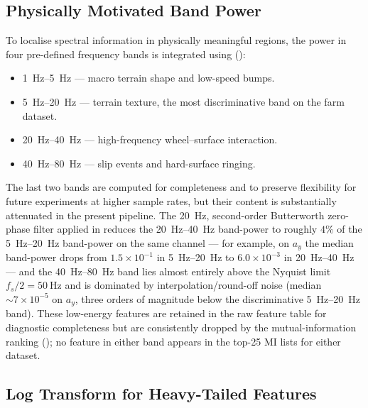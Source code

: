 \subsection{Physically Motivated Band Power}

To localise spectral information in physically meaningful regions, the power in four pre-defined frequency bands is integrated using  ():

\begin{itemize}
    \item \SIrange{1}{5}{\hertz} --- macro terrain shape and low-speed bumps.
    \item \SIrange{5}{20}{\hertz} --- terrain texture, the most discriminative band on the farm dataset.
    \item \SIrange{20}{40}{\hertz} --- high-frequency wheel--surface interaction.
    \item \SIrange{40}{80}{\hertz} --- slip events and hard-surface ringing.
\end{itemize}

The last two bands are computed for completeness and to preserve flexibility for future experiments at higher sample rates, but their content is substantially attenuated in the present pipeline. The \SI{20}{\hertz}, second-order Butterworth zero-phase filter applied in  reduces the \SIrange{20}{40}{\hertz} band-power to roughly $4\%$ of the \SIrange{5}{20}{\hertz} band-power on the same channel --- for example, on $a_y$ the median band-power drops from $1.5 \times 10^{-1}$ in \SIrange{5}{20}{\hertz} to $6.0 \times 10^{-3}$ in \SIrange{20}{40}{\hertz} --- and the \SIrange{40}{80}{\hertz} band lies almost entirely above the Nyquist limit $f_s/2 = \SI{50}{\hertz}$ and is dominated by interpolation/round-off noise (median $\sim 7 \times 10^{-5}$ on $a_y$, three orders of magnitude below the discriminative \SIrange{5}{20}{\hertz} band). These low-energy features are retained in the raw feature table for diagnostic completeness but are consistently dropped by the mutual-information ranking (); no feature in either band appears in the top-25 MI lists for either dataset.

\subsection{Log Transform for Heavy-Tailed Features}


